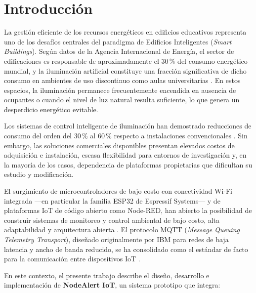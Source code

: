 
\section{Introducción}

La gestión eficiente de los recursos energéticos en edificios educativos representa
uno de los desafíos centrales del paradigma de Edificios Inteligentes (\textit{Smart
Buildings}). Según datos de la Agencia Internacional de Energía, el sector de
edificaciones es responsable de aproximadamente el 30\,\% del consumo energético
mundial, y la iluminación artificial constituye una fracción significativa de dicho
consumo en ambientes de uso discontinuo como aulas universitarias \parencite{IEA2023}.
En estos espacios, la iluminación permanece frecuentemente encendida en ausencia
de ocupantes o cuando el nivel de luz natural resulta suficiente, lo que genera un
desperdicio energético evitable.

Los sistemas de control inteligente de iluminación han demostrado reducciones de
consumo del orden del 30\,\% al 60\,\% respecto a instalaciones convencionales
\parencite{Kralikova2016}. Sin embargo, las soluciones comerciales disponibles
presentan elevados costos de adquisición e instalación, escasa flexibilidad para
entornos de investigación y, en la mayoría de los casos, dependencia de plataformas
propietarias que dificultan su estudio y modificación.

El surgimiento de microcontroladores de bajo costo con conectividad Wi-Fi integrada
—en particular la familia ESP32 de Espressif Systems— y de plataformas IoT de código
abierto como Node-RED, han abierto la posibilidad de construir sistemas de monitoreo
y control ambiental de bajo costo, alta adaptabilidad y arquitectura abierta
\parencite{NodeRED2024, Espressif2024}. El protocolo MQTT (\textit{Message Queuing
Telemetry Transport}), diseñado originalmente por IBM para redes de baja latencia y
ancho de banda reducido, se ha consolidado como el estándar de facto para la
comunicación entre dispositivos IoT \parencite{Banks2019}.

En este contexto, el presente trabajo describe el diseño, desarrollo e implementación
de \textbf{NodeAlert IoT}, un sistema prototipo que integra:

